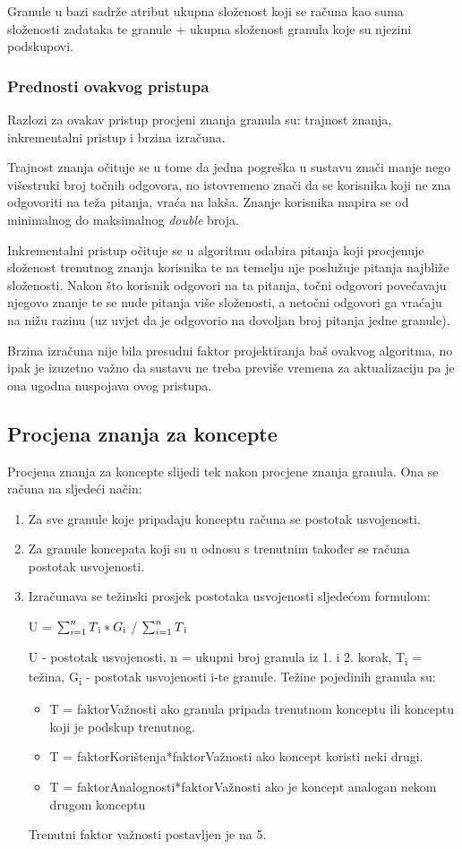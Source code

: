 \documentclass[times, utf8, zavrsni, numeric]{fer}
\begin{document}
Granule u bazi sadrže atribut ukupna složenost koji se računa kao suma složenosti zadataka te granule + ukupna složenost granula koje su njezini podskupovi.

\subsubsection{Prednosti ovakvog pristupa}
Razlozi za ovakav pristup procjeni znanja granula su: trajnost znanja, inkrementalni pristup i brzina izračuna.
\par
Trajnost znanja očituje se u tome da jedna pogreška u sustavu znači manje nego višestruki broj točnih odgovora, no istovremeno znači da se korisnika koji ne zna odgovoriti na teža pitanja, vraća na lakša. Znanje korisnika mapira se od minimalnog do maksimalnog \textit{double} broja.
\par
Inkrementalni pristup očituje se u algoritmu odabira pitanja koji procjenuje složenost trenutnog znanja korisnika te na temelju nje poslužuje pitanja najbliže složenosti. Nakon što korisnik odgovori na ta pitanja, točni odgovori povećavaju njegovo znanje te se nude pitanja više složenosti, a netočni odgovori ga vraćaju na nižu razinu (uz uvjet da je odgovorio na dovoljan broj pitanja jedne granule).
\par
Brzina izračuna nije bila presudni faktor projektiranja baš ovakvog algoritma, no ipak je izuzetno važno da sustavu ne treba previše vremena za aktualizaciju pa je ona ugodna nuspojava ovog pristupa.

\subsection{Procjena znanja za koncepte}
Procjena znanja za koncepte slijedi tek nakon procjene znanja granula. Ona se računa na sljedeći način:
\begin{enumerate}
	\item Za sve granule koje pripadaju konceptu računa se postotak usvojenosti.
	\item Za granule koncepata koji su u odnosu s trenutnim također se računa postotak usvojenosti.
	\item Izračunava se težinski prosjek postotaka usvojenosti sljedećom formulom:
	\begin{center}
		U = $\sum_{i=1}^{n} T\textsubscript{i}*G\textsubscript{i}$ / $\sum_{i=1}^{n} T\textsubscript{i}$
	\end{center}
	U - postotak usvojenosti, n = ukupni broj granula iz 1. i 2. korak, T\textsubscript{i} = težina, G\textsubscript{i} - postotak usvojenosti i-te granule.
	Težine pojedinih granula su:
	\begin{itemize}
		\item T = faktorVažnosti ako granula pripada trenutnom konceptu ili konceptu koji je podskup trenutnog.
		\item T = faktorKorištenja*faktorVažnosti ako koncept koristi neki drugi.
		\item T = faktorAnalognosti*faktorVažnosti ako je koncept analogan nekom drugom konceptu
	\end{itemize}
	Trenutni faktor važnosti postavljen je na 5.
\end{enumerate}
\end{document}
